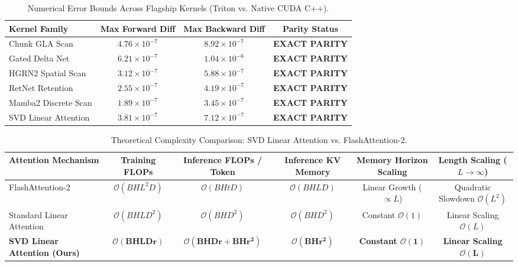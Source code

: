\documentclass[journal]{IEEEtran}
\begin{document}
\begin{table}[h]
\centering
\caption{Numerical Error Bounds Across Flagship Kernels (Triton vs. Native CUDA C++).}
\label{tab:triton_cuda_parity}
\begin{tabular}{lccc}
\toprule
\textbf{Kernel Family} & \textbf{Max Forward Diff} & \textbf{Max Backward Diff} & \textbf{Parity Status} \\
\midrule
Chunk GLA Scan & $4.76 \times 10^{-7}$ & $8.92 \times 10^{-7}$ & \textbf{EXACT PARITY} \\
Gated Delta Net & $6.21 \times 10^{-7}$ & $1.04 \times 10^{-6}$ & \textbf{EXACT PARITY} \\
HGRN2 Spatial Scan & $3.12 \times 10^{-7}$ & $5.88 \times 10^{-7}$ & \textbf{EXACT PARITY} \\
RetNet Retention & $2.55 \times 10^{-7}$ & $4.19 \times 10^{-7}$ & \textbf{EXACT PARITY} \\
Mamba2 Discrete Scan & $1.89 \times 10^{-7}$ & $3.45 \times 10^{-7}$ & \textbf{EXACT PARITY} \\
SVD Linear Attention & $3.81 \times 10^{-7}$ & $7.12 \times 10^{-7}$ & \textbf{EXACT PARITY} \\
\bottomrule
\end{tabular}
\end{table}

\begin{table}[t]
\centering
\caption{Theoretical Complexity Comparison: SVD Linear Attention vs. FlashAttention-2.}
\label{tab:complexity_comparison}
\begin{tabular}{lccccc}
\toprule
\textbf{Attention Mechanism} & \textbf{Training FLOPs} & \textbf{Inference FLOPs / Token} & \textbf{Inference KV Memory} & \textbf{Memory Horizon Scaling} & \textbf{Length Scaling ($L \to \infty$)} \\
\midrule
FlashAttention-2 & $\mathcal{O}(B H L^2 D)$ & $\mathcal{O}(B H t D)$ & $\mathcal{O}(B H L D)$ & Linear Growth ($\propto L$) & Quadratic Slowdown $\mathcal{O}(L^2)$ \\
Standard Linear Attention & $\mathcal{O}(B H L D^2)$ & $\mathcal{O}(B H D^2)$ & $\mathcal{O}(B H D^2)$ & Constant $\mathcal{O}(1)$ & Linear Scaling $\mathcal{O}(L)$ \\
\textbf{SVD Linear Attention (Ours)} & $\pmb{\mathcal{O}(B H L D r)}$ & $\pmb{\mathcal{O}(B H D r + B H r^2)}$ & $\pmb{\mathcal{O}(B H r^2)}$ & \textbf{Constant $\pmb{\mathcal{O}(1)}$} & \textbf{Linear Scaling $\pmb{\mathcal{O}(L)}$} \\
\bottomrule
\end{tabular}
\end{table}
\end{document}
